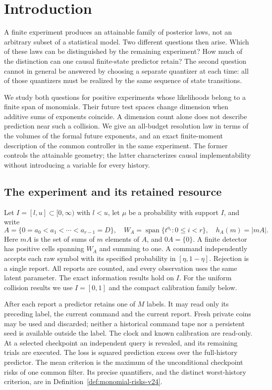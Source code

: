 \section{Introduction}
\label{sec:introduction}
A finite experiment produces an attainable family of posterior laws,
not an arbitrary subset of a statistical model. Two different questions
then arise. Which of these laws can be distinguished by the remaining
experiment? How much of the distinction can one causal finite-state
predictor retain? The second question cannot in general be answered
by choosing a separate quantizer at each time: all of those quantizers
must be realized by the same sequence of state transitions.

We study both questions for positive experiments whose likelihoods
belong to a finite span of monomials. Their future test spaces change
dimension when additive sums of exponents coincide. A dimension count
alone does not describe prediction near such a collision. We give an
all-budget resolution law in terms of the volumes of the formal future
exponents, and an exact finite-moment description of the common
controller in the same experiment. The former controls the attainable
geometry; the latter characterizes causal implementability without
introducing a variable for every history.

\subsection{The experiment and its retained resource}
Let $I=[l,u]\subset[0,\infty)$ with $l<u$, let $\mu$ be a probability
with support $I$, and write
\[
 A=\{0=a_0<a_1<\cdots<a_{r-1}=D\},\quad
 W_A=\operatorname{span}\{t^{a_i}:0\le i<r\},\quad
 h_A(m)=|mA|.
\]
Here $mA$ is the set of sums of $m$ elements of $A$, and $0A=\{0\}$.
A finite detector has positive cells spanning $W_A$ and summing to one.
A command independently accepts each raw symbol with its specified
probability in $[\eta,1-\eta]$. Rejection is a single report. All reports
are counted, and every observation uses the same latent parameter.
The exact information results hold on $I$. For the uniform collision
results we use $I=[0,1]$ and the compact calibration family below.

After each report a predictor retains one of $M$ labels. It may read
only its preceding label, the current command and the current report.
Fresh private coins may be used and discarded; neither a historical
command tape nor a persistent seed is available outside the label.
The clock and known calibration are read-only. At a selected checkpoint
an independent query is revealed, and its remaining trials are executed.
The loss is squared prediction excess over the full-history predictor.
The mean criterion is the maximum of the unconditional checkpoint
risks of one common filter. Its precise quantifiers, and the distinct
worst-history criterion, are in
Definition~\ref{def:monomial-risks-v24}.

